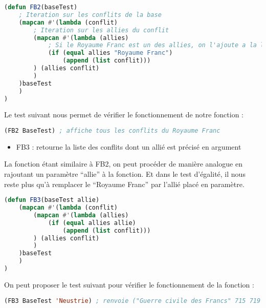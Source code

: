 \documentclass[a4paper, 12pt]{article}
\begin{document}
\begin{lstlisting}[language=Lisp]
(defun FB2(baseTest)
    ; Iteration sur les conflits de la base
    (mapcan #'(lambda (conflit)
        ; Iteration sur les allies du conflit
        (mapcan #'(lambda (allies)
            ; Si le Royaume Franc est un des allies, on l'ajoute a la liste a retourner
            (if (equal allies "Royaume Franc")
                (append (list conflit)))
        ) (allies conflit)
        )
    )baseTest
    )
)
\end{lstlisting}
\vspace{2mm}
Le test suivant nous permet de vérifier le fonctionnement de notre fonction :
\vspace{2mm}

\begin{lstlisting}[language=Lisp]
(FB2 BaseTest) ; affiche tous les conflits du Royaume Franc
\end{lstlisting}
\vspace{5mm}

\begin{itemize}[label=\textbullet]
    \item FB3 : retourne la liste des conflits dont un allié est précisé en argument
    \end{itemize}
\vspace{3mm}

La fonction étant similaire à FB2, on peut procéder de manière analogue en rajoutant un paramètre “allie” à la fonction. Et dans le test d’égalité, il nous reste plus qu’à remplacer le “Royaume Franc” par l’allié placé en paramètre.
\vspace{2mm}

\begin{lstlisting}[language=Lisp]
(defun FB3(baseTest allie)
    (mapcan #'(lambda (conflit)
        (mapcan #'(lambda (allies)
            (if (equal allies allie)
                (append (list conflit)))
        ) (allies conflit)
        )
    )baseTest
    )
)
\end{lstlisting}
\vspace{2mm}
On peut proposer le test suivant pour vérifier le fonctionnement de la fonction :
\vspace{2mm}

\begin{lstlisting}[language=Lisp]
(FB3 BaseTest 'Neustrie) ; renvoie ("Guerre civile des Francs" 715 719 (("Neustrie") ("Austrasie")) ("Royaume Franc"))
\end{lstlisting}
\vspace{5mm}
\end{document}
